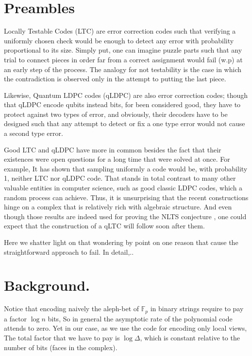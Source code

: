 \documentclass[manuscript,screen,review]{acmart}
\begin{document}
\section{Preambles}

Locally Testable Codes (LTC) are error correction codes such that verifying a uniformly chosen check would be enough to detect any error with probability proportional to its size. Simply put, one can imagine puzzle parts such that any trial to connect pieces in order far from a correct assignment would fail (w.p) at an early step of the process. The analogy for not testability is the case in which the contradiction is observed only in the attempt to putting the last piece.
 
 Likewise, Quantum LDPC codes (qLDPC) are also error correction codes; though that qLDPC encode qubits instead bits, for been considered good, they have to protect against two types of error, and obviously, their decoders have to be designed such that any attempt to detect or fix a one type error would not cause a second type error.
 
 Good LTC and qLDPC have more in common besides the fact that their existences were open questions for a long time that were solved at once. For example, It has shown that sampling uniformly a code would be, with probability 1, neither LTC \cite{Sasson} nor qLDPC code. That stands in total contrast to many other valuable entities in computer science,  such as good classic LDPC codes, which a random process can achieve. Thus, it is unsurprising that the recent constructions hinge on a complex that is relatively rich with algebraic structure. And even though those results are indeed used for proving the NLTS conjecture \cite{anshu2022nlts}, one could expect that the construction of a qLTC will follow soon after them. 

 Here we shatter light on that wondering by point on one reason that cause the straightforward approach to fail. In detail,..    



\section{Background.}



Notice that encoding naively the aleph-bet of $\mathbb{F}_{p}$ in binary strings require to pay a factor $\log n$ bits, So in general the asymptotic rate of the polynomial code attends to zero. Yet in our case, as we use the code for encoding only local views, The total factor that we have to pay is $\log\Delta$, which is constant relative to the number of bits (faces in the complex).   
\end{document}
